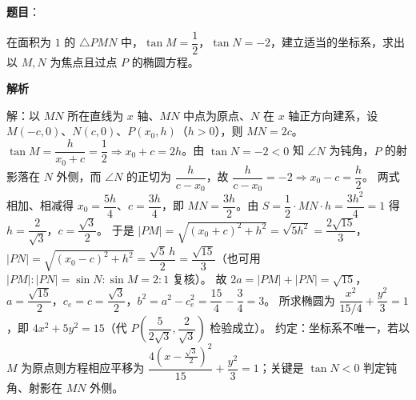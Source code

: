 \begin{answer}

\textbf{题目}：

在面积为 $1$ 的 $\triangle PMN$ 中，$\tan M=\dfrac12$，$\tan N=-2$，建立适当的坐标系，求出以 $M,N$ 为焦点且过点 $P$ 的椭圆方程。

\textbf{解析}

解：以 $MN$ 所在直线为 $x$ 轴、$MN$ 中点为原点、$N$ 在 $x$ 轴正方向建系，设 $M(-c,0)$、$N(c,0)$、$P(x_0,h)$（$h>0$），则 $MN=2c$。
$\tan M=\dfrac{h}{x_0+c}=\dfrac12\Rightarrow x_0+c=2h$。由 $\tan N=-2<0$ 知 $\angle N$ 为钝角，$P$ 的射影落在 $N$ 外侧，而 $\angle N$ 的正切为 $\dfrac{h}{c-x_0}$，故 $\dfrac{h}{c-x_0}=-2\Rightarrow x_0-c=\dfrac h2$。
两式相加、相减得 $x_0=\dfrac{5h}{4}$、$c=\dfrac{3h}{4}$，即 $MN=\dfrac{3h}{2}$。由 $S=\dfrac12\cdot MN\cdot h=\dfrac{3h^2}{4}=1$ 得 $h=\dfrac{2}{\sqrt3}$，$c=\dfrac{\sqrt3}{2}$。
于是 $|PM|=\sqrt{(x_0+c)^2+h^2}=\sqrt{5h^2}=\dfrac{2\sqrt{15}}{3}$，$|PN|=\sqrt{(x_0-c)^2+h^2}=\dfrac{\sqrt5\,h}{2}=\dfrac{\sqrt{15}}{3}$（也可用 $|PM|:|PN|=\sin N:\sin M=2:1$ 复核）。
故 $2a=|PM|+|PN|=\sqrt{15}$，$a=\dfrac{\sqrt{15}}{2}$，$c_e=c=\dfrac{\sqrt3}{2}$，$b^2=a^2-c_e^2=\dfrac{15}{4}-\dfrac34=3$。
所求椭圆为 $\dfrac{x^2}{15/4}+\dfrac{y^2}{3}=1$，即 $4x^2+5y^2=15$（代 $P\left(\dfrac{5}{2\sqrt3},\dfrac{2}{\sqrt3}\right)$ 检验成立）。
约定：坐标系不唯一，若以 $M$ 为原点则方程相应平移为 $\dfrac{4\left(x-\frac{\sqrt3}{2}\right)^2}{15}+\dfrac{y^2}{3}=1$；关键是 $\tan N<0$ 判定钝角、射影在 $MN$ 外侧。


\end{answer}

